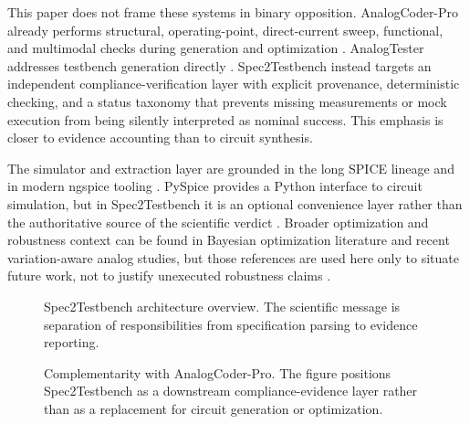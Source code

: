 \documentclass[conference]{IEEEtran}%
\begin{document}
This paper does not frame these systems in binary opposition. AnalogCoder-Pro already performs structural, operating-point, direct-current sweep, functional, and multimodal checks during generation and optimization \cite{analogcoderpro_2025}. AnalogTester addresses testbench generation directly \cite{analogtester_2025}. Spec2Testbench instead targets an independent compliance-verification layer with explicit provenance, deterministic checking, and a status taxonomy that prevents missing measurements or mock execution from being silently interpreted as nominal success. This emphasis is closer to evidence accounting than to circuit synthesis.

The simulator and extraction layer are grounded in the long SPICE lineage and in modern ngspice tooling \cite{nagel_rohrer_1971_cancer,nagel_pederson_1973_spice,nagel_1975_spice2,ngspice_manual_2026}. PySpice provides a Python interface to circuit simulation, but in Spec2Testbench it is an optional convenience layer rather than the authoritative source of the scientific verdict \cite{pyspice_repo_2026}. Broader optimization and robustness context can be found in Bayesian optimization literature and recent variation-aware analog studies, but those references are used here only to situate future work, not to justify unexecuted robustness claims \cite{brochu_2010_bo,snoek_2012_bo,frazier_2018_bo,lefebvre_2022_pvt,patil_2023_pvt,setupkit_2025,rashid_2023_evolutionary,brokaw_1974_bandgap,tsividis_1980_temperature}.

\begin{figure}[t]
\centering
{}
\caption{Spec2Testbench architecture overview. The scientific message is separation of responsibilities from specification parsing to evidence reporting.}
\label{fig:architecture}
\end{figure}

\begin{figure}[t]
\centering
{}
\caption{Complementarity with AnalogCoder-Pro. The figure positions Spec2Testbench as a downstream compliance-evidence layer rather than as a replacement for circuit generation or optimization.}
\label{fig:complementarity}
\end{figure}
\end{document}
